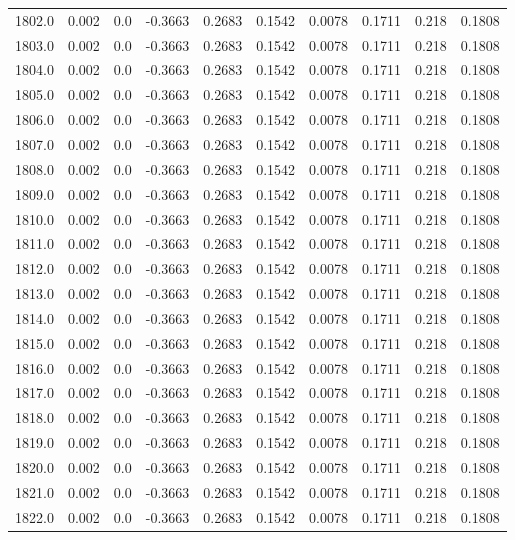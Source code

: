 \begin{longtable}{lrrrrrrrrr}
1802.0 & 0.002 & 0.0 & -0.3663 & 0.2683 & 0.1542 & 0.0078 & 0.1711 & 0.218 & 0.1808 \\
1803.0 & 0.002 & 0.0 & -0.3663 & 0.2683 & 0.1542 & 0.0078 & 0.1711 & 0.218 & 0.1808 \\
1804.0 & 0.002 & 0.0 & -0.3663 & 0.2683 & 0.1542 & 0.0078 & 0.1711 & 0.218 & 0.1808 \\
1805.0 & 0.002 & 0.0 & -0.3663 & 0.2683 & 0.1542 & 0.0078 & 0.1711 & 0.218 & 0.1808 \\
1806.0 & 0.002 & 0.0 & -0.3663 & 0.2683 & 0.1542 & 0.0078 & 0.1711 & 0.218 & 0.1808 \\
1807.0 & 0.002 & 0.0 & -0.3663 & 0.2683 & 0.1542 & 0.0078 & 0.1711 & 0.218 & 0.1808 \\
1808.0 & 0.002 & 0.0 & -0.3663 & 0.2683 & 0.1542 & 0.0078 & 0.1711 & 0.218 & 0.1808 \\
1809.0 & 0.002 & 0.0 & -0.3663 & 0.2683 & 0.1542 & 0.0078 & 0.1711 & 0.218 & 0.1808 \\
1810.0 & 0.002 & 0.0 & -0.3663 & 0.2683 & 0.1542 & 0.0078 & 0.1711 & 0.218 & 0.1808 \\
1811.0 & 0.002 & 0.0 & -0.3663 & 0.2683 & 0.1542 & 0.0078 & 0.1711 & 0.218 & 0.1808 \\
1812.0 & 0.002 & 0.0 & -0.3663 & 0.2683 & 0.1542 & 0.0078 & 0.1711 & 0.218 & 0.1808 \\
1813.0 & 0.002 & 0.0 & -0.3663 & 0.2683 & 0.1542 & 0.0078 & 0.1711 & 0.218 & 0.1808 \\
1814.0 & 0.002 & 0.0 & -0.3663 & 0.2683 & 0.1542 & 0.0078 & 0.1711 & 0.218 & 0.1808 \\
1815.0 & 0.002 & 0.0 & -0.3663 & 0.2683 & 0.1542 & 0.0078 & 0.1711 & 0.218 & 0.1808 \\
1816.0 & 0.002 & 0.0 & -0.3663 & 0.2683 & 0.1542 & 0.0078 & 0.1711 & 0.218 & 0.1808 \\
1817.0 & 0.002 & 0.0 & -0.3663 & 0.2683 & 0.1542 & 0.0078 & 0.1711 & 0.218 & 0.1808 \\
1818.0 & 0.002 & 0.0 & -0.3663 & 0.2683 & 0.1542 & 0.0078 & 0.1711 & 0.218 & 0.1808 \\
1819.0 & 0.002 & 0.0 & -0.3663 & 0.2683 & 0.1542 & 0.0078 & 0.1711 & 0.218 & 0.1808 \\
1820.0 & 0.002 & 0.0 & -0.3663 & 0.2683 & 0.1542 & 0.0078 & 0.1711 & 0.218 & 0.1808 \\
1821.0 & 0.002 & 0.0 & -0.3663 & 0.2683 & 0.1542 & 0.0078 & 0.1711 & 0.218 & 0.1808 \\
1822.0 & 0.002 & 0.0 & -0.3663 & 0.2683 & 0.1542 & 0.0078 & 0.1711 & 0.218 & 0.1808 \\

\end{longtable}
